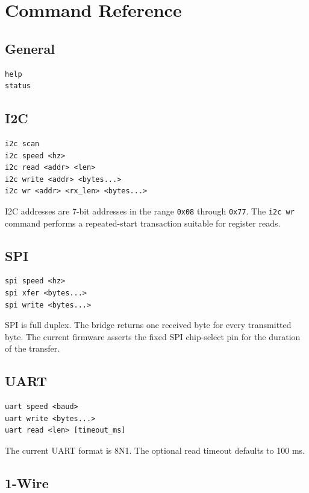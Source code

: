 \documentclass[11pt]{article}
\begin{document}
\section{Command Reference}

\subsection{General}

\begin{lstlisting}[style=bridge]
help
status
\end{lstlisting}

\subsection{I2C}

\begin{lstlisting}[style=bridge]
i2c scan
i2c speed <hz>
i2c read <addr> <len>
i2c write <addr> <bytes...>
i2c wr <addr> <rx_len> <bytes...>
\end{lstlisting}

I2C addresses are 7-bit addresses in the range \texttt{0x08} through \texttt{0x77}. The \texttt{i2c wr} command performs a repeated-start transaction suitable for register reads.

\subsection{SPI}

\begin{lstlisting}[style=bridge]
spi speed <hz>
spi xfer <bytes...>
spi write <bytes...>
\end{lstlisting}

SPI is full duplex. The bridge returns one received byte for every transmitted byte. The current firmware asserts the fixed SPI chip-select pin for the duration of the transfer.

\subsection{UART}

\begin{lstlisting}[style=bridge]
uart speed <baud>
uart write <bytes...>
uart read <len> [timeout_ms]
\end{lstlisting}

The current UART format is 8N1. The optional read timeout defaults to 100 ms.

\subsection{1-Wire}
\end{document}
